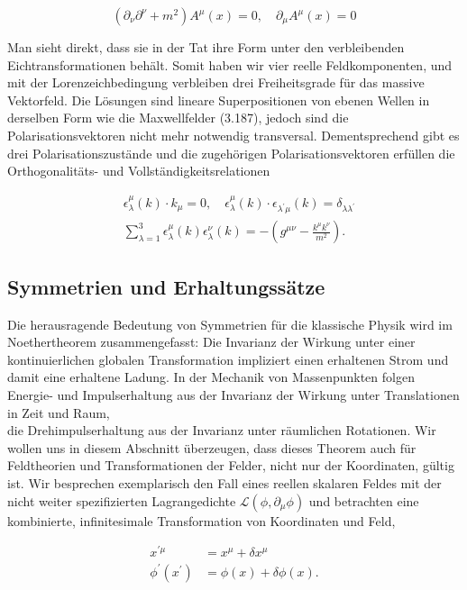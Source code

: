 \documentclass[10pt, letterpaper]{article}
\begin{document}
$$
\left(\partial_{\nu} \partial^{\nu}+m^{2}\right) A^{\mu}(x)=0, \quad \partial_{\mu} A^{\mu}(x)=0
$$

Man sieht direkt, dass sie in der Tat ihre Form unter den verbleibenden Eichtransformationen behält. Somit haben wir vier reelle Feldkomponenten, und mit der Lorenzeichbedingung verbleiben drei Freiheitsgrade für das massive Vektorfeld. Die Lösungen sind lineare Superpositionen von ebenen Wellen in derselben Form wie die Maxwellfelder (3.187), jedoch sind die Polarisationsvektoren nicht mehr notwendig transversal. Dementsprechend gibt es drei Polarisationszustände und die zugehörigen Polarisationsvektoren erfüllen die Orthogonalitäts- und Vollständigkeitsrelationen

$$
\begin{aligned}
& \epsilon_{\lambda}^{\mu}(k) \cdot k_{\mu}=0, \quad \epsilon_{\lambda}^{\mu}(k) \cdot \epsilon_{\lambda^{\prime} \mu}(k)=\delta_{\lambda \lambda^{\prime}} \\
& \sum_{\lambda=1}^{3} \epsilon_{\lambda}^{\mu}(k) \epsilon_{\lambda}^{\nu}(k)=-\left(g^{\mu \nu}-\frac{k^{\mu} k^{\nu}}{m^{2}}\right) .
\end{aligned}
$$


\pagebreak

\subsection{Symmetrien und Erhaltungssätze}
Die herausragende Bedeutung von Symmetrien für die klassische Physik wird im Noethertheorem zusammengefasst: Die Invarianz der Wirkung unter einer kontinuierlichen globalen Transformation impliziert einen erhaltenen Strom und damit eine erhaltene Ladung. In der Mechanik von Massenpunkten folgen Energie- und Impulserhaltung aus der Invarianz der Wirkung unter Translationen in Zeit und Raum,\\
die Drehimpulserhaltung aus der Invarianz unter räumlichen Rotationen. Wir wollen uns in diesem Abschnitt überzeugen, dass dieses Theorem auch für Feldtheorien und Transformationen der Felder, nicht nur der Koordinaten, gültig ist. Wir besprechen exemplarisch den Fall eines reellen skalaren Feldes mit der nicht weiter spezifizierten Lagrangedichte $\mathscr{L}\left(\phi, \partial_{\mu} \phi\right)$ und betrachten eine kombinierte, infinitesimale Transformation von Koordinaten und Feld,

$$
\begin{aligned}
x^{\prime \mu} & =x^{\mu}+\delta x^{\mu} \\
\phi^{\prime}\left(x^{\prime}\right) & =\phi(x)+\delta \phi(x) .
\end{aligned}
$$
\end{document}
